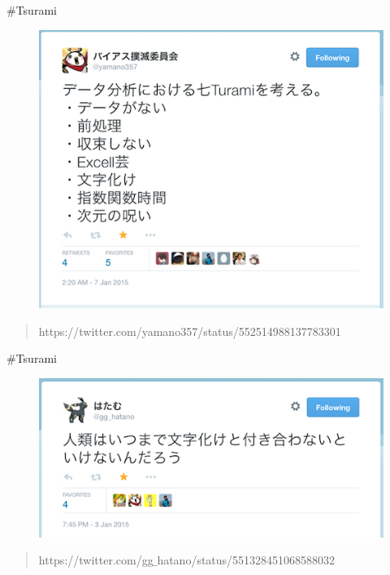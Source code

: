 \documentclass[17pt,ignorenonframetext,]{beamer}
\begin{document}
\begin{frame}{\#Tsurami}

\begin{figure}
  \includegraphics[scale = 0.8]{images/tsurami.png}
\end{figure}

\begin{quote}
\scriptsize{https://twitter.com/yamano357/status/552514988137783301}
\end{quote}

\end{frame}

\begin{frame}{\#Tsurami}

\begin{figure}
  \includegraphics[scale = 0.8]{images/tsurami2.png}
\end{figure}

\begin{quote}
\scriptsize{https://twitter.com/gg$\_$hatano/status/551328451068588032}
\end{quote}

\end{frame}
\end{document}
